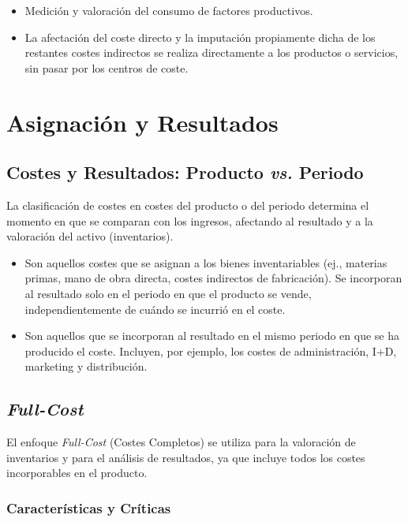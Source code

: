 \begin{itemize}
    \item {} Medición y valoración del consumo de factores productivos.
    \item {} La afectación del coste directo y la imputación propiamente dicha de los restantes costes indirectos se realiza directamente a los productos o servicios, sin pasar por los centros de coste.
\end{itemize}

\section{Asignación y Resultados}

\subsection{Costes y Resultados: Producto \textit{vs.} Periodo}

La clasificación de costes en costes del producto o del periodo determina el momento en que se comparan con los ingresos, afectando al resultado y a la valoración del activo (inventarios).

\begin{itemize}
    \item {} Son aquellos costes que se asignan a los bienes inventariables (ej., materias primas, mano de obra directa, costes indirectos de fabricación). Se incorporan al resultado solo en el periodo en que el producto se vende, independientemente de cuándo se incurrió en el coste.
    \item {} Son aquellos que se incorporan al resultado en el mismo periodo en que se ha producido el coste. Incluyen, por ejemplo, los costes de administración, I+D, marketing y distribución.
\end{itemize}

\subsection{\textit{Full-Cost}}

El enfoque \textit{Full-Cost} (Costes Completos) se utiliza para la valoración de inventarios y para el análisis de resultados, ya que incluye todos los costes incorporables en el producto.

\subsubsection{Características y Críticas}

